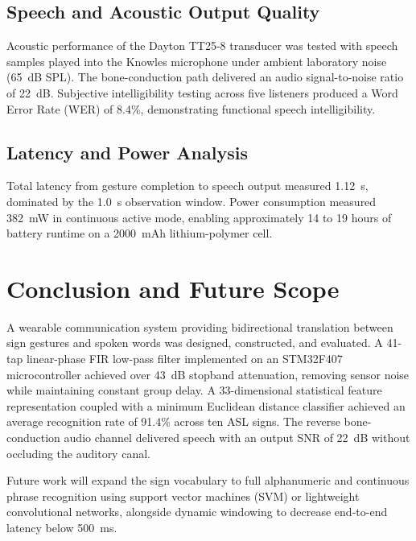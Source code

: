 \documentclass[conference]{IEEEtran}
\begin{document}
\subsection{Speech and Acoustic Output Quality}
Acoustic performance of the Dayton TT25-8 transducer was tested with speech samples played into the Knowles microphone under ambient laboratory noise (65~dB SPL). The bone-conduction path delivered an audio signal-to-noise ratio of 22~dB. Subjective intelligibility testing across five listeners produced a Word Error Rate (WER) of 8.4\%, demonstrating functional speech intelligibility.

\subsection{Latency and Power Analysis}
Total latency from gesture completion to speech output measured 1.12~s, dominated by the 1.0~s observation window. Power consumption measured 382~mW in continuous active mode, enabling approximately 14 to 19 hours of battery runtime on a 2000~mAh lithium-polymer cell.

\section{Conclusion and Future Scope}
\label{sec:conclusion}

A wearable communication system providing bidirectional translation between sign gestures and spoken words was designed, constructed, and evaluated. A 41-tap linear-phase FIR low-pass filter implemented on an STM32F407 microcontroller achieved over 43~dB stopband attenuation, removing sensor noise while maintaining constant group delay. A 33-dimensional statistical feature representation coupled with a minimum Euclidean distance classifier achieved an average recognition rate of 91.4\% across ten ASL signs. The reverse bone-conduction audio channel delivered speech with an output SNR of 22~dB without occluding the auditory canal.

Future work will expand the sign vocabulary to full alphanumeric and continuous phrase recognition using support vector machines (SVM) or lightweight convolutional networks, alongside dynamic windowing to decrease end-to-end latency below 500~ms.
\end{document}
